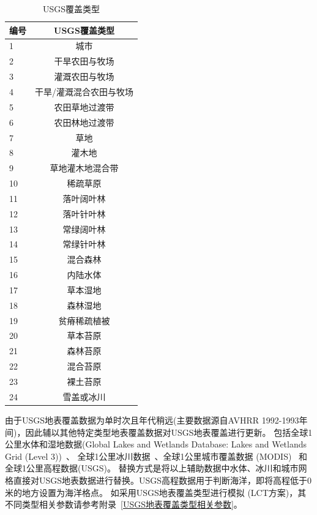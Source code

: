 \begin{table}[]
\centering
\caption{USGS覆盖类型}
\label{tab:USGS覆盖类型}
\begin{tabular}{@{}lc@{}}
\toprule
编号 & USGS覆盖类型     \\ \midrule
1  & 城市           \\
2  & 干旱农田与牧场      \\
3  & 灌溉农田与牧场      \\
4  & 干旱/灌溉混合农田与牧场 \\
5  & 农田草地过渡带      \\
6  & 农田林地过渡带      \\
7  & 草地           \\
8  & 灌木地          \\
9  & 草地灌木地混合带     \\
10 & 稀疏草原         \\
11 & 落叶阔叶林        \\
12 & 落叶针叶林        \\
13 & 常绿阔叶林        \\
14 & 常绿针叶林        \\
15 & 混合森林         \\
16 & 内陆水体         \\
17 & 草本湿地         \\
18 & 森林湿地         \\
19 & 贫瘠稀疏植被       \\
20 & 草本苔原         \\
21 & 森林苔原         \\
22 & 混合苔原         \\
23 & 裸土苔原         \\
24 & 雪盖或冰川        \\ \bottomrule
\end{tabular}
\end{table}


由于USGS地表覆盖数据为单时次且年代稍远(主要数据源自AVHRR 1992-1993年间)，因此辅以其他特定类型地表覆盖数据对USGS地表覆盖进行更新。
包括全球1公里水体和湿地数据(Global Lakes and Wetlands Database: Lakes and Wetlands Grid (Level 3))~\citep{lehner2004development}、
全球1公里冰川数据~\citep{RGIConsortium2017}、全球1公里城市覆盖数据 (MODIS)~\citep{schneider2009new} 和全球1公里高程数据(USGS)。
替换方式是将以上辅助数据中水体、冰川和城市网格直接对USGS地表数据进行替换。USGS高程数据用于判断海洋，即将高程低于0米的地方设置为海洋格点。
如采用USGS地表覆盖类型进行模拟 (LCT方案)，其不同类型相关参数请参考附录~\ref{USGS地表覆盖类型相关参数}。

